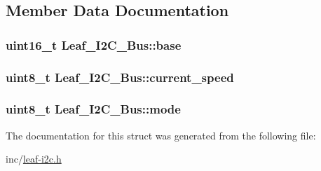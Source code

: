 \subsection{Member Data Documentation}
\hypertarget{structLeaf__I2C__Bus_a828e3bef566a5f9b7dc02d6e6788e1b9}{
\subsubsection[{base}]{\setlength{\rightskip}{0pt plus 5cm}uint16\-\_\-t Leaf\-\_\-\-I2\-C\-\_\-\-Bus\-::base}}\label{structLeaf__I2C__Bus_a828e3bef566a5f9b7dc02d6e6788e1b9}
\hypertarget{structLeaf__I2C__Bus_a18b52797d914609d770b8942a447487d}{
\subsubsection[{current\-\_\-speed}]{\setlength{\rightskip}{0pt plus 5cm}uint8\-\_\-t Leaf\-\_\-\-I2\-C\-\_\-\-Bus\-::current\-\_\-speed}}\label{structLeaf__I2C__Bus_a18b52797d914609d770b8942a447487d}
\hypertarget{structLeaf__I2C__Bus_a19a3888b5a4c0342d05fe0de36bc62bc}{
\subsubsection[{mode}]{\setlength{\rightskip}{0pt plus 5cm}uint8\-\_\-t Leaf\-\_\-\-I2\-C\-\_\-\-Bus\-::mode}}\label{structLeaf__I2C__Bus_a19a3888b5a4c0342d05fe0de36bc62bc}


The documentation for this struct was generated from the following file\-:\begin{DoxyCompactItemize}
\item 
inc/\hyperlink{leaf-i2c_8h}{leaf-\/i2c.\-h}\end{DoxyCompactItemize}
